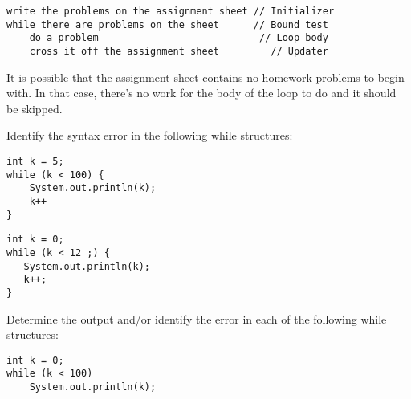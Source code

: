\begin{jjjlisting}
\begin{lstlisting}
write the problems on the assignment sheet // Initializer
while there are problems on the sheet      // Bound test
    do a problem                            // Loop body
    cross it off the assignment sheet         // Updater
\end{lstlisting}
\end{jjjlisting}

\noindent It is possible that the assignment sheet contains
no homework problems to begin with. In that case, there's no work for
the body of the loop to do and it should be skipped.

\label{self-study-exercises}
\begin{SSTUDY}
\item  Identify the syntax error in the following while structures:
\begin{EXRLL}
\item

\begin{jjjlisting}
\begin{lstlisting}
int k = 5;
while (k < 100) {
    System.out.println(k);
    k++
}
\end{lstlisting}
\end{jjjlisting}

\item 

\begin{jjjlisting}
\begin{lstlisting}
int k = 0;
while (k < 12 ;) {
   System.out.println(k);
   k++;
}
\end{lstlisting}
\end{jjjlisting}
\end{EXRLL}


\item  Determine the output and/or identify the error in each of the following
while structures:
\begin{EXRLL}
\item

\begin{jjjlisting}
\begin{lstlisting}
int k = 0;
while (k < 100)
    System.out.println(k);
\end{lstlisting}
\end{jjjlisting}

\item


\end{EXRLL}
\end{SSTUDY}
